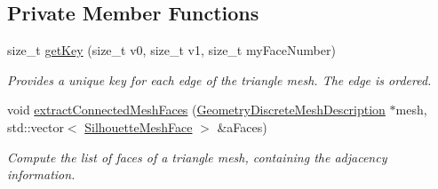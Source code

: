 \subsection*{Private Member Functions}
\begin{DoxyCompactItemize}
\item 
\mbox{\label{classvisilib_1_1_geometry_occluder_set_aadda8bb194352673b9fac4750655d786}} 
size\+\_\+t \mbox{\hyperlink{classvisilib_1_1_geometry_occluder_set_aadda8bb194352673b9fac4750655d786}{get\+Key}} (size\+\_\+t v0, size\+\_\+t v1, size\+\_\+t my\+Face\+Number)
\begin{DoxyCompactList}\small\item\em Provides a unique key for each edge of the triangle mesh. The edge is ordered. \end{DoxyCompactList}\item 
void \mbox{\hyperlink{classvisilib_1_1_geometry_occluder_set_af27ea9d9989db7c759054b8024317d58}{extract\+Connected\+Mesh\+Faces}} (\mbox{\hyperlink{structvisilib_1_1_geometry_discrete_mesh_description}{Geometry\+Discrete\+Mesh\+Description}} $\ast$mesh, std\+::vector$<$ \mbox{\hyperlink{classvisilib_1_1_silhouette_mesh_face}{Silhouette\+Mesh\+Face}} $>$ \&a\+Faces)
\begin{DoxyCompactList}\small\item\em Compute the list of faces of a triangle mesh, containing the adjacency information. \end{DoxyCompactList}\end{DoxyCompactItemize}
